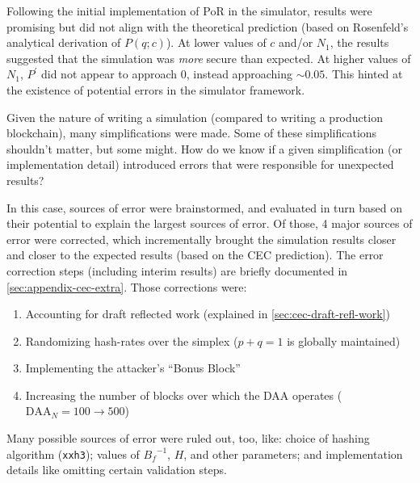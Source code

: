 
Following the initial implementation of PoR in the simulator, results were promising but did not align with the theoretical prediction (based on Rosenfeld's analytical derivation of $P(q; c)$).
At lower values of $c$ and/or $N_1$, the results suggested that the simulation was \emph{more} secure than expected.
At higher values of $N_1$, $P^\prime$ did not appear to approach 0, instead approaching $\sim 0.05$.
This hinted at the existence of potential errors in the simulator framework.

Given the nature of writing a simulation (compared to writing a production blockchain), many simplifications were made.
Some of these simplifications shouldn't matter, but some might.
How do we know if a given simplification (or implementation detail) introduced errors that were responsible for unexpected results?

In this case, sources of error were brainstormed, and evaluated in turn based on their potential to explain the largest sources of error.
Of those, 4 major sources of error were corrected, which incrementally brought the simulation results closer and closer to the expected results (based on the CEC prediction).
The error correction steps (including interim results) are briefly documented in \autoref{sec:appendix-cec-extra}.
Those corrections were:

\begin{enumerate}
    \item Accounting for draft reflected work (explained in \autoref{sec:cec-draft-refl-work})
    \item Randomizing hash-rates over the simplex ($p + q = 1$ is globally maintained)
    \item Implementing the attacker's ``Bonus Block''
    \item Increasing the number of blocks over which the DAA operates ($\text{DAA}_N = 100 \to 500$)
\end{enumerate}

Many possible sources of error were ruled out, too, like: choice of hashing algorithm (\texttt{xxh3}); values of ${B_f}^{-1}$, $H$, and other parameters; and implementation details like omitting certain validation steps.


